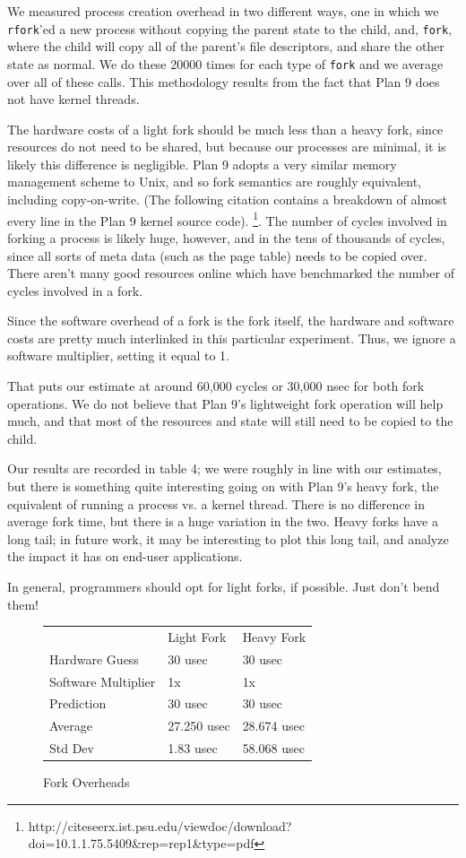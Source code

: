 \documentclass[letterpaper,twocolumn,10pt]{article}
\begin{document}
We measured process creation overhead in two different ways, one in which we
\texttt{rfork}'ed a new process without copying the parent state to the child,
and, \texttt{fork}, where the child will copy all of the parent's file
descriptors, and share the other state as normal. We do these 20000 times for
each type of \texttt{fork} and we average over all of these calls. This methodology
results from the fact that Plan 9 does not have kernel threads.

The hardware costs of a light fork should be much less than a heavy fork, since
resources do not need to be shared, but because our processes are minimal, it
is likely this difference is negligible. Plan 9 adopts a very similar memory management
scheme to Unix, and so fork semantics are roughly equivalent, including copy-on-write. (The 
following citation contains a breakdown of almost every line in the Plan 9 kernel source code).
\footnote{http://citeseerx.ist.psu.edu/viewdoc/download? doi=10.1.1.75.5409\&rep=rep1\&type=pdf}. The number
of cycles involved in forking a process is likely huge, however, and in the tens of thousands of 
cycles, since all sorts of meta data (such as the page table) needs to be copied over. There 
aren't many good resources online which have benchmarked the number of cycles involved in a fork.

Since the software overhead of a fork is the fork itself, the hardware and software costs are 
pretty much interlinked in this particular experiment. Thus, we ignore a software multiplier, setting it
equal to 1. 

That puts our estimate at around 60,000 cycles or 30,000 nsec for both fork operations. We do not 
believe that Plan 9's lightweight fork operation will help much, and that most of the resources 
and state will still need to be copied to the child.

Our results are recorded in table 4; we were roughly in line with our estimates, but there is something quite interesting going on with Plan 9's heavy fork, the equivalent of running a process vs. a kernel thread. There is no difference in average fork time, but there is a huge variation in the two. Heavy forks have a long tail; in future work, it may be interesting to plot this long tail, and analyze the impact it has on end-user applications.

In general, programmers should opt for light forks, if possible. Just don't bend them!

\begin{figure}
	\centering
\begin{tabular}{lll}
        & Light Fork & Heavy Fork \\
Hardware Guess & 30 usec & 30 usec \\
Software Multiplier & 1x & 1x \\
Prediction & 30 usec & 30 usec \\
Average & 27.250  usec & 28.674  usec \\
Std Dev & 1.83 usec & 58.068 usec                  
\end{tabular}
\caption{Fork Overheads}
\label{tab:forkoverheads}
\end{figure}
\end{document}
